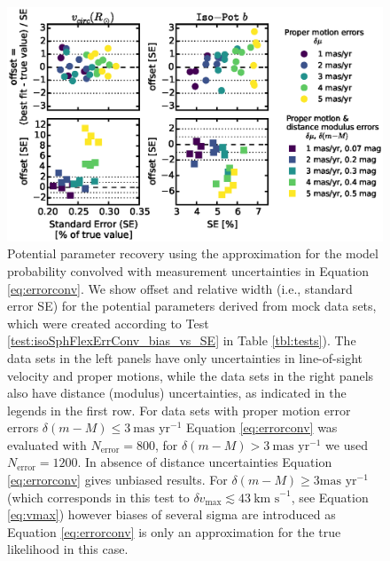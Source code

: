 
\begin{figure}[!htbp]
\centering
\includegraphics[width=\columnwidth]{figs/isoSphFlexErrConv_bias_vs_SE.eps}
\caption{Potential parameter recovery using the approximation for the model probability convolved with measurement uncertainties in Equation \ref{eq:errorconv}. We show  \pdf{} offset and relative width (i.e., standard error SE) for the potential parameters derived from mock data sets, which were created according to Test \ref{test:isoSphFlexErrConv_bias_vs_SE} in Table \ref{tbl:tests}). The data sets in the left panels have only uncertainties in line-of-sight velocity and proper motions, while the data sets in the right panels also have distance (modulus) uncertainties, as indicated in the legends in the first row. For data sets with proper motion error errors $\delta(m-M) \leq 3 \ \text{mas yr}^{-1}$ Equation \ref{eq:errorconv} was evaluated with $N_\text{error}=800$, for $\delta(m-M) > 3 \ \text{mas yr}^{-1}$ we used $N_\text{error}=1200$. In absence of distance uncertainties Equation \ref{eq:errorconv} gives unbiased results. For $\delta(m-M) \geq 3 \text{mas yr}^{-1}$ (which corresponds in this test to $\delta v_\text{max} \lesssim 43 \ \text{km s}^{-1}$, see Equation \ref{eq:vmax}) however biases of several sigma are introduced as Equation \ref{eq:errorconv} is only an approximation for the true likelihood in this case.}
\label{fig:isoSphFlexErrConv_bias_vs_SE}
\end{figure}





